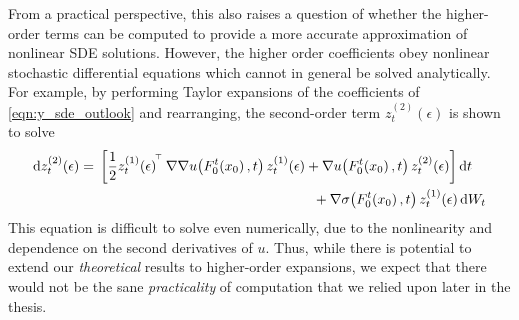 From a practical perspective, this also raises a question of whether the higher-order terms can be computed to provide a more accurate approximation of nonlinear SDE solutions.
However, the higher order coefficients obey nonlinear stochastic differential equations which cannot in general be solved analytically.
For example, by performing Taylor expansions of the coefficients of \eqref{eqn:y_sde_outlook} and rearranging, the second-order term \(z_t^{(2)}\!\left(\epsilon\right)\) is shown to solve
\[
	\dif z_t^{(2)}\!\left(\epsilon\right) = \begin{multlined}[t]
		\left[\frac12 z_t^{(1)}\!\left(\epsilon\right)^{\T} \nabla\nabla u\!\left(F_0^t\!\left(x_0\right), t\right) z_t^{(1)}\!\left(\epsilon\right) + \nabla u\!\left(F_0^t\!\left(x_0\right), t\right) z_t^{(2)}\!\left(\epsilon\right)\right]\dif t \\
		+ \nabla \sigma \!\left(F_0^t\!\left(x_0\right), t\right) z_t^{(1)}\!\left(\epsilon\right)\dif W_t
	\end{multlined}
\]
This equation is difficult to solve even numerically, due to the nonlinearity and dependence on the second derivatives of \(u\).
Thus, while there is potential to extend our \emph{theoretical} results to higher-order expansions, we expect that there would not be the sane \emph{practicality} of computation that we relied upon later in the thesis.


